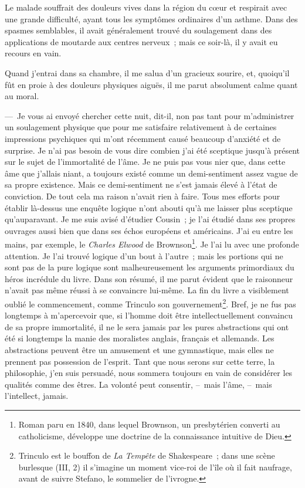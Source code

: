\documentclass[french,twoside]{book} %
\begin{document}
Le malade souffrait des douleurs vives dans la région du cœur et respirait avec une grande difficulté, ayant tous les symptômes ordinaires d’un asthme. Dans des spasmes semblables, il avait généralement trouvé du soulagement dans des applications de moutarde aux centres nerveux ; mais ce soir-là, il y avait eu recours en vain.\par
Quand j’entrai dans sa chambre, il me salua d’un gracieux sourire, et, quoiqu’il fût en proie à des douleurs physiques aiguës, il me parut absolument calme quant au moral.\par
— Je vous ai envoyé chercher cette nuit, dit-il, non pas tant pour m’administrer un soulagement physique que pour me satisfaire relativement à de certaines impressions psychiques qui m’ont récemment causé beaucoup d’anxiété et de surprise. Je n’ai pas besoin de vous dire combien j’ai été sceptique jusqu’à présent sur le sujet de l’immortalité de l’âme. Je ne puis pas vous nier que, dans cette âme que j’allais niant, a toujours existé comme un demi-sentiment assez vague de sa propre existence. Mais ce demi-sentiment ne s’est jamais élevé à l’état de conviction. De tout cela ma raison n’avait rien à faire. Tous mes efforts pour établir là-dessus une enquête logique n’ont abouti qu’à me laisser plus sceptique qu’auparavant. Je me suis avisé d’étudier Cousin ; je l’ai étudié dans ses propres ouvrages aussi bien que dans ses échos européens et américains. J’ai eu entre les mains, par exemple, le \emph{Charles Elwood} de Brownson\footnote{Roman paru en 1840, dans lequel Brownson, un presbytérien converti au catholicisme, développe une doctrine de la connaissance intuitive de Dieu.}. Je l’ai lu avec une profonde attention. Je l’ai trouvé logique d’un bout à l’autre ; mais les portions qui ne sont pas de la pure logique sont malheureusement les arguments primordiaux du héros incrédule du livre. Dans son résumé, il me parut évident que le raisonneur n’avait pas même réussi à se convaincre lui-même. La fin du livre a visiblement oublié le commencement, comme Trinculo son gouvernement\footnote{Trinculo est le bouffon de \emph{La Tempête} de Shakespeare ; dans une scène burlesque (III, 2) il s’imagine un moment vice-roi de l’île où il fait naufrage, avant de suivre Stefano, le sommelier de l’ivrogne.}. Bref, je ne fus pas longtemps à m’apercevoir que, si l’homme doit être intellectuellement convaincu de sa propre immortalité, il ne le sera jamais par les pures abstractions qui ont été si longtemps la manie des moralistes anglais, français et allemands. Les abstractions peuvent être un amusement et une gymnastique, mais elles ne prennent pas possession de l’esprit. Tant que nous serons sur cette terre, la philosophie, j’en suis persuadé, nous sommera toujours en vain de considérer les qualités comme des êtres. La volonté peut consentir, – mais l’âme, – mais l’intellect, jamais.\par
\end{document}
